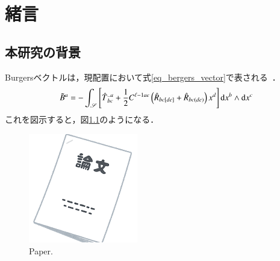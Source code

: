 \chapter{緒言}
\label{ch_preface}

\section{本研究の背景}
\label{preface_background}
Burgersベクトルは，現配置において式\eqref{eq_bergers_vector}で表される~\cite{kondo1955non-riemannian}．
%
\begin{equation}
  \label{eq_bergers_vector}
    \tilde{B}{}^{a}
    = -\int_{\mathscr{S}} \left[ \hat{T}{}^{..a}_{bc} + \frac{1}{2} C^{\ell{}-1ae}
      \left( \hat{R}{}_{bc[de]} + \hat{R}{}_{bc(de)} \right) x^{d} \right] \mathrm{d} x^{b} \wedge \mathrm{d} x^{c}
  \dotfill
\end{equation}
%
これを図示すると，図\ref{fig_paper_irasutoya}のようになる．
%
\begin{figure}[bp]
    \centering
    \includegraphics{./figure/document_ronbun_taba.png}
    \caption{Paper.}
    \label{fig_paper_irasutoya}
\end{figure}
%

